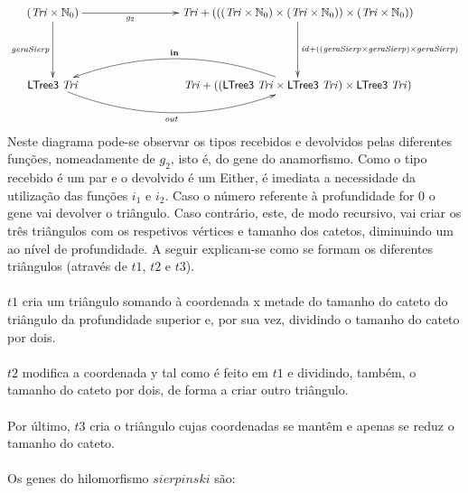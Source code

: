\documentclass[a4paper]{article}
\newcommand{\Conid}[1]{\mathit{#1}}
\newcommand{\Varid}[1]{\mathit{#1}}
\begin{document}
\begin{eqnarray*}
\xymatrix@C=3cm@R=1.7cm{
    \ensuremath{(\Conid{Tri}\times\N_0)}
           \ar[d]_-{\ensuremath{\Varid{geraSierp}}}
           \ar[r]_-{\ensuremath{g_2 }}
&
    \ensuremath{\Conid{Tri}\mathbin{+}(((\Conid{Tri}\times\N_0)\times(\Conid{Tri}\times\N_0))\times(\Conid{Tri}\times\N_0))}
           \ar[d]^{\ensuremath{\Varid{id}\mathbin{+}((\Varid{geraSierp}\times\Varid{geraSierp})\times\Varid{geraSierp})}}
\\
     \ensuremath{\mathsf{LTree3}\;\Conid{Tri}}
            \ar@/_2pc/[r]_-{\ensuremath{\Varid{out}}}
&
     \ensuremath{\Conid{Tri}\mathbin{+}((\mathsf{LTree3}\;\Conid{Tri}\times\mathsf{LTree3}\;\Conid{Tri})\times\mathsf{LTree3}\;\Conid{Tri})}
           \ar@/_2pc/[l]_-{\ensuremath{\mathbf{in}}}
}
\end{eqnarray*}
Neste diagrama pode-se observar os tipos recebidos e devolvidos pelas diferentes
 funções, nomeadamente de \ensuremath{g_2 }, isto é, do gene do anamorfismo. Como o tipo
 recebido é um par e o devolvido é um Either, é imediata a necessidade da 
utilização das funções \ensuremath{i_1} e \ensuremath{i_2}. Caso o número referente à profundidade for 0 o gene vai devolver o triângulo. Caso contrário, este, de modo recursivo, vai criar os três triângulos com os respetivos vértices e tamanho dos catetos, diminuindo um ao nível de profundidade. A seguir explicam-se como se formam os diferentes triângulos (através de \ensuremath{\Varid{t1}}, \ensuremath{\Varid{t2}} e \ensuremath{\Varid{t3}}).
\\
\\
\ensuremath{\Varid{t1}} cria um triângulo somando à coordenada x metade do tamanho do cateto do triângulo da profundidade superior e, por sua vez, dividindo o tamanho do cateto por dois. 
\\
\\
\ensuremath{\Varid{t2}} modifica a coordenada y tal como é feito em \ensuremath{\Varid{t1}} e dividindo, também, o tamanho do cateto por dois, de forma a criar outro triângulo.
\\
\\
Por último, \ensuremath{\Varid{t3}} cria o triângulo cujas coordenadas se mantêm e apenas se reduz o tamanho do cateto. 
\\
\\
Os genes do hilomorfismo \ensuremath{\Varid{sierpinski}} são:
\end{document}
